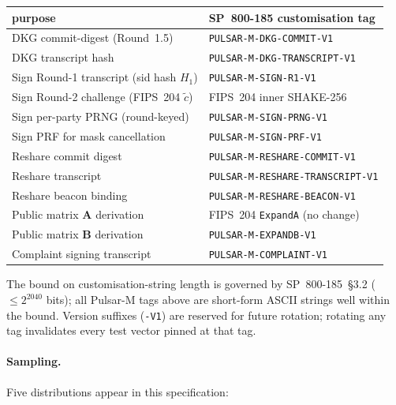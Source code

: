 \documentclass[11pt,a4paper]{article}
\theoremstyle{definition}
\theoremstyle{remark}
\begin{document}
\begin{center}\small
\begin{tabular}{l l}
\toprule
purpose & SP~800-185 customisation tag \\
\midrule
DKG commit-digest (Round~1.5)            & \texttt{PULSAR-M-DKG-COMMIT-V1} \\
DKG transcript hash                       & \texttt{PULSAR-M-DKG-TRANSCRIPT-V1} \\
Sign Round-1 transcript (sid hash $H_1$)  & \texttt{PULSAR-M-SIGN-R1-V1} \\
Sign Round-2 challenge (FIPS~204 $\tilde c$) & FIPS~204 inner SHAKE-256 \\
Sign per-party PRNG (round-keyed)         & \texttt{PULSAR-M-SIGN-PRNG-V1} \\
Sign PRF for mask cancellation            & \texttt{PULSAR-M-SIGN-PRF-V1} \\
Reshare commit digest                      & \texttt{PULSAR-M-RESHARE-COMMIT-V1} \\
Reshare transcript                         & \texttt{PULSAR-M-RESHARE-TRANSCRIPT-V1} \\
Reshare beacon binding                     & \texttt{PULSAR-M-RESHARE-BEACON-V1} \\
Public matrix $\mathbf{A}$ derivation       & FIPS~204 \texttt{ExpandA} (no change) \\
Public matrix $\mathbf{B}$ derivation       & \texttt{PULSAR-M-EXPANDB-V1} \\
Complaint signing transcript               & \texttt{PULSAR-M-COMPLAINT-V1} \\
\bottomrule
\end{tabular}
\end{center}

The bound on customisation-string length is governed by
SP~800-185~\S3.2 ($\le 2^{2040}$ bits); all Pulsar-M tags above are
short-form ASCII strings well within the bound. Version
suffixes (\texttt{-V1}) are reserved for future rotation; rotating any
tag invalidates every test vector pinned at that tag.

\paragraph{Sampling.} Five distributions appear in this specification:
\end{document}
